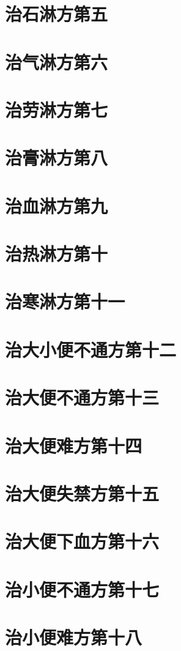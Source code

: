 \documentclass[a4paper,12pt,UTF8,twoside]{ctexbook}
\begin{document}
\chapter{治石淋方第五}
\chapter{治气淋方第六}
\chapter{治劳淋方第七}
\chapter{治膏淋方第八}
\chapter{治血淋方第九}
\chapter{治热淋方第十}
\chapter{治寒淋方第十一}
\chapter{治大小便不通方第十二}
\chapter{治大便不通方第十三}
\chapter{治大便难方第十四}
\chapter{治大便失禁方第十五}
\chapter{治大便下血方第十六}
\chapter{治小便不通方第十七}
\chapter{治小便难方第十八}
\end{document}

